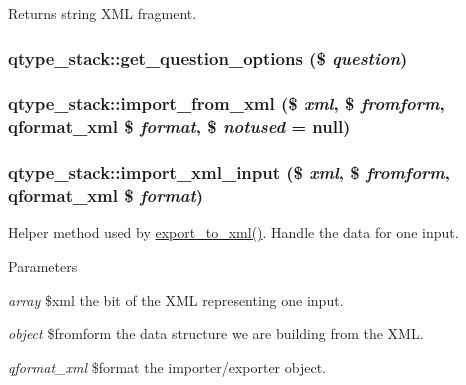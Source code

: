\begin{DoxyReturn}{Returns}
string XML fragment. 
\end{DoxyReturn}
\hypertarget{classqtype__stack_a36c0eb7d400874083182297c8e5674e7}{
\subsubsection[{get\_\-question\_\-options}]{\setlength{\rightskip}{0pt plus 5cm}qtype\_\-stack::get\_\-question\_\-options (\$ {\em question})}}
\label{classqtype__stack_a36c0eb7d400874083182297c8e5674e7}
\hypertarget{classqtype__stack_ab498c618fa8b907cab2cb841dbe2ace6}{
\subsubsection[{import\_\-from\_\-xml}]{\setlength{\rightskip}{0pt plus 5cm}qtype\_\-stack::import\_\-from\_\-xml (\$ {\em xml}, \/  \$ {\em fromform}, \/  qformat\_\-xml \$ {\em format}, \/  \$ {\em notused} = {\ttfamily null})}}
\label{classqtype__stack_ab498c618fa8b907cab2cb841dbe2ace6}
\hypertarget{classqtype__stack_adb3dbc4c2122921992b19768cd0405c9}{
\subsubsection[{import\_\-xml\_\-input}]{\setlength{\rightskip}{0pt plus 5cm}qtype\_\-stack::import\_\-xml\_\-input (\$ {\em xml}, \/  \$ {\em fromform}, \/  qformat\_\-xml \$ {\em format})}}
\label{classqtype__stack_adb3dbc4c2122921992b19768cd0405c9}
Helper method used by \hyperlink{classqtype__stack_abb4e2b1212e53ee6c4a36f2315d3e085}{export\_\-to\_\-xml()}. Handle the data for one input. 
\begin{DoxyParams}{Parameters}
\item[{\em array}]\$xml the bit of the XML representing one input. \item[{\em object}]\$fromform the data structure we are building from the XML. \item[{\em qformat\_\-xml}]\$format the importer/exporter object. \end{DoxyParams}
